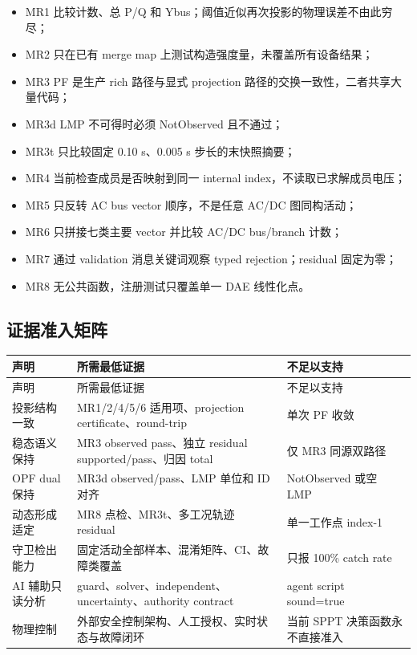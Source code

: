 \begin{itemize}
  \item MR1 比较计数、总 P/Q 和 Ybus；阈值近似再次投影的物理误差不由此穷尽；
  \item MR2 只在已有 merge map 上测试构造强度量，未覆盖所有设备结果；
  \item MR3 PF 是生产 rich 路径与显式 projection 路径的交换一致性，二者共享大量代码；
  \item MR3d LMP 不可得时必须 NotObserved 且不通过；
  \item MR3t 只比较固定 0.10 s、0.005 s 步长的末快照摘要；
  \item MR4 当前检查成员是否映射到同一 internal index，不读取已求解成员电压；
  \item MR5 只反转 AC bus vector 顺序，不是任意 AC/DC 图同构活动；
  \item MR6 只拼接七类主要 vector 并比较 AC/DC bus/branch 计数；
  \item MR7 通过 validation 消息关键词观察 typed rejection；residual 固定为零；
  \item MR8 无公共函数，注册测试只覆盖单一 DAE 线性化点。
\end{itemize}

\subsection{证据准入矩阵}

\begin{center}\footnotesize
\begin{longtable}{@{}L{3.8cm}L{5.6cm}L{5.8cm}@{}}
\toprule 声明 & 所需最低证据 & 不足以支持\\\midrule
\endfirsthead
\toprule 声明 & 所需最低证据 & 不足以支持\\\midrule\endhead
投影结构一致 & MR1/2/4/5/6 适用项、projection certificate、round-trip & 单次 PF 收敛\\
稳态语义保持 & MR3 observed pass、独立 residual supported/pass、归因 total & 仅 MR3 同源双路径\\
OPF dual 保持 & MR3d observed/pass、LMP 单位和 ID 对齐 & NotObserved 或空 LMP\\
动态形成适定 & MR8 点检、MR3t、多工况轨迹 residual & 单一工作点 index-1\\
守卫检出能力 & 固定活动全部样本、混淆矩阵、CI、故障类覆盖 & 只报 100\% catch rate\\
AI 辅助只读分析 & guard、solver、independent、uncertainty、authority contract & agent script sound=true\\
物理控制 & 外部安全控制架构、人工授权、实时状态与故障闭环 & 当前 SPPT 决策函数永不直接准入\\
\bottomrule
\end{longtable}
\end{center}

